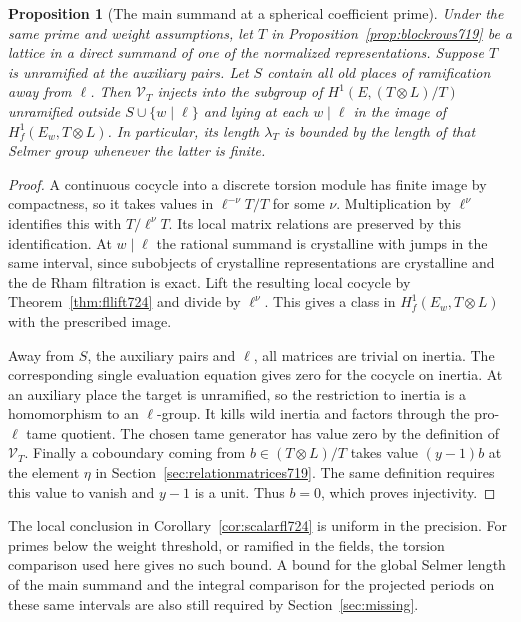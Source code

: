 \documentclass[a4paper,11pt]{article}
\newtheorem{proposition}{Proposition}[section]
\theoremstyle{definition}
\theoremstyle{remark}
\numberwithin{equation}{section}
\begin{document}
\begin{proposition}[The main summand at a spherical coefficient prime]
\leavevmode\label{prop:mainselmer724}
Under the same prime and weight assumptions, let \(T\) in
Proposition~\ref{prop:blockrows719} be a lattice in a direct summand of
one of the normalized representations. Suppose \(T\) is unramified at
the auxiliary pairs. Let \(S\) contain all old places of ramification
away from \(\ell\). Then \(\mathcal V_T\) injects into the subgroup of
\(H^1(E,(T\otimes L)/T)\) unramified outside \(S\cup\{w\mid\ell\}\)
and lying at each \(w\mid\ell\) in the image of
\(H^1_f(E_w,T\otimes L)\). In particular, its length \(\lambda_T\) is
bounded by the length of that Selmer group whenever the latter is finite.
\end{proposition}
\begin{proof}
A continuous cocycle into a discrete torsion module has finite image by
compactness, so it takes values in \(\ell^{-\nu}T/T\) for some \(\nu\).
Multiplication by \(\ell^\nu\) identifies this with \(T/\ell^\nu T\).
Its local matrix relations are preserved by this identification. At
\(w\mid\ell\) the rational summand is crystalline with jumps in the same
interval, since subobjects of crystalline representations are crystalline
and the de Rham filtration is exact. Lift the resulting local cocycle
by Theorem~\ref{thm:fllift724} and divide by \(\ell^\nu\). This gives a
class in \(H^1_f(E_w,T\otimes L)\) with the prescribed image.

Away from \(S\), the auxiliary pairs and \(\ell\), all matrices are
trivial on inertia. The corresponding single evaluation equation
gives zero for the cocycle on inertia. At an auxiliary place the
target is unramified, so the restriction to inertia is a homomorphism
to an \(\ell\)-group. It kills wild inertia and factors through the
pro-\(\ell\) tame quotient. The chosen tame generator has value zero
by the definition of \(\mathcal V_T\). Finally a coboundary coming
from \(b\in(T\otimes L)/T\) takes value \((y-1)b\) at the element
\(\eta\) in Section~\ref{sec:relationmatrices719}. The same definition
requires this value to vanish and \(y-1\) is a unit. Thus \(b=0\),
which proves injectivity.
\end{proof}

The local conclusion in Corollary~\ref{cor:scalarfl724} is uniform
in the precision. For primes below the weight threshold, or ramified
in the fields, the torsion comparison used here gives no such bound.
A bound for the global Selmer length of the main summand and the
integral comparison for the projected periods on these same intervals
are also still required by Section~\ref{sec:missing}.
\clearpage
\end{document}
